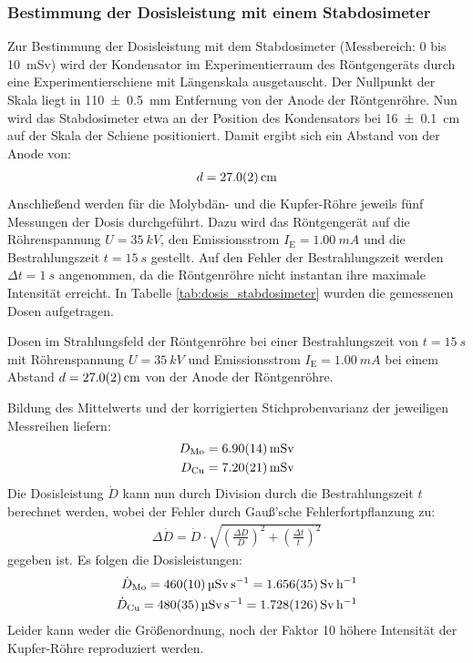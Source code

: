 \documentclass[11pt, a4paper]{article}
\numberwithin{equation}{section}
\begin{document}
\subsubsection{Bestimmung der Dosisleistung mit einem Stabdosimeter}
Zur Bestimmung der Dosisleistung mit dem Stabdosimeter (Messbereich: \num{0} bis \SI{10}{mSv}) wird der Kondensator im Experimentierraum des Röntgengeräts durch eine Experimentierschiene mit Längenskala ausgetauscht.
Der Nullpunkt der Skala liegt in \SI{110 +- 0.5}{mm} Entfernung von der Anode der Röntgenröhre.
Nun wird das Stabdosimeter etwa an der Position des Kondensators bei \SI{16 +- 0.1}{cm} auf der Skala der Schiene positioniert.
Damit ergibt sich ein Abstand von der Anode von:
\begin{align*}
	d = \SI{27.0 +- 0.2}{cm}
\end{align*}
Anschließend werden für die Molybdän- und die Kupfer-Röhre jeweils fünf Messungen der Dosis durchgeführt.
Dazu wird das Röntgengerät auf die Röhrenspannung $U = \SI{35}{kV}$, den Emissionsstrom $I_\mathrm{E} = \SI{1.00}{mA}$ und die Bestrahlungszeit $t = \SI{15}{s}$ gestellt.
Auf den Fehler der Bestrahlungszeit werden $\Delta t = \SI{1}{s}$ angenommen, da die Röntgenröhre nicht instantan ihre maximale Intensität erreicht.
In Tabelle \ref{tab:dosis_stabdosimeter} wurden die gemessenen Dosen aufgetragen.
\begin{table}[h]
	\centering
	
	\caption{Dosen im Strahlungsfeld der Röntgenröhre bei einer Bestrahlungszeit von $t=\SI{15}{s}$ mit Röhrenspannung $U=\SI{35}{kV}$ und Emissionsstrom $I_\mathrm{E} = \SI{1.00}{mA}$ bei einem Abstand $d=\SI{27 +- 0.2}{cm}$ von der Anode der Röntgenröhre.}
	\label{tab:dosis_stabdosimeter}
\end{table}
Bildung des Mittelwerts und der korrigierten Stichprobenvarianz der jeweiligen Messreihen liefern:
\begin{align*}
	D_\mathrm{Mo} = \SI{6.90 +- 0.14}{mSv} \\
	D_\mathrm{Cu} = \SI{7.20 +- 0.21}{mSv}
\end{align*}
Die Dosisleistung $\dot{D}$ kann nun durch Division durch die Bestrahlungszeit $t$ berechnet werden, wobei der Fehler durch Gauß'sche Fehlerfortpflanzung zu:
\begin{align}
	\Delta \dot{D} = \dot{D} \cdot \sqrt{\left( \frac{\Delta D}{D} \right)^2 + \left( \frac{\Delta t}{t} \right)^2}
\end{align}
gegeben ist.
Es folgen die Dosisleistungen:
\begin{align*}
	\dot{D}_\mathrm{Mo} = \SI{460 +- 10}{\micro\sievert\per\second} = \SI{1.656 +- 0.035}{\sievert\per\hour}\\
	\dot{D}_\mathrm{Cu} = \SI{480 +- 35}{\micro\sievert\per\second} = \SI{1.728 +- 0.126}{\sievert\per\hour}
\end{align*}
Leider kann weder die Größenordnung, noch der Faktor 10 höhere Intensität der Kupfer-Röhre reproduziert werden.
\end{document}

